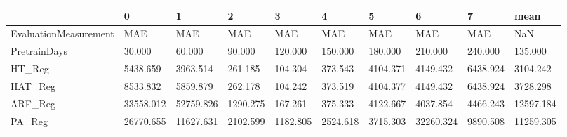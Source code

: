 \begin{tabular}{llllllllll}
\toprule
{} &         0 &         1 &        2 &        3 &        4 &        5 &         6 &        7 &      mean \\
\midrule
EvaluationMeasurement &       MAE &       MAE &      MAE &      MAE &      MAE &      MAE &       MAE &      MAE &       NaN \\
PretrainDays          &    30.000 &    60.000 &   90.000 &  120.000 &  150.000 &  180.000 &   210.000 &  240.000 &   135.000 \\
HT\_Reg                &  5438.659 &  3963.514 &  261.185 &  104.304 &  373.543 & 4104.371 &  4149.432 & 6438.924 &  3104.242 \\
HAT\_Reg               &  8533.832 &  5859.879 &  262.178 &  104.242 &  373.519 & 4104.377 &  4149.432 & 6438.924 &  3728.298 \\
ARF\_Reg               & 33558.012 & 52759.826 & 1290.275 &  167.261 &  375.333 & 4122.667 &  4037.854 & 4466.243 & 12597.184 \\
PA\_Reg                & 26770.655 & 11627.631 & 2102.599 & 1182.805 & 2524.618 & 3715.303 & 32260.324 & 9890.508 & 11259.305 \\
\bottomrule
\end{tabular}
